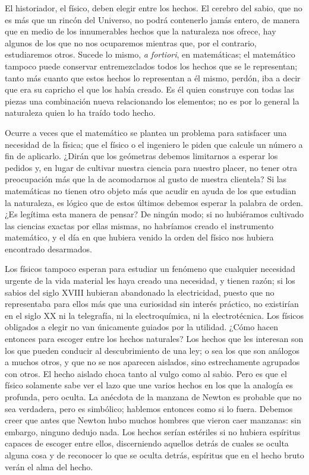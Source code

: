 \documentclass[a4paper, 12pt]{article}
\begin{document}
El historiador, el físico, deben elegir entre los hechos. El cerebro
del sabio, que no es más que un rincón del Universo, no podrá
contenerlo jamás entero, de manera que en medio de los innumerables
hechos que la naturaleza nos ofrece, hay algunos de los que no nos
ocuparemos mientras que, por el contrario, estudiaremos otros. Sucede lo
mismo, \textit{a fortiori}, en matemáticas; el matemático tampoco puede
conservar entremezclados todos los hechos que se le representan; tanto más cuanto que estos hechos lo representan a él mismo, perdón,
iba a decir que era su capricho el que los había creado. Es él
quien construye con todas las piezas una combinación nueva relacionando
los elementos; no es por lo general la naturaleza quien lo ha traído
todo hecho.

Ocurre a veces que el matemático se plantea un problema para satisfacer
una necesidad de la física; que el físico o el ingeniero le piden
que calcule un número a fin de aplicarlo. ¿Dirán que los geómetras debemos limitarnos a esperar los pedidos y, en lugar de cultivar
nuestra ciencia para nuestro placer, no tener otra preocupación más
que la de acomodarnos al gusto de nuestra clientela? Si las matemáticas
no tienen otro objeto más que acudir en ayuda de los que estudian la
naturaleza, es lógico que de estos últimos debemos esperar la
palabra de orden. ¿Es legítima esta manera de pensar? De ningún
modo; si no hubiéramos cultivado las ciencias exactas por ellas mismas,
no habríamos creado el instrumento matemático, y el día en que
hubiera venido la orden del físico nos hubiera encontrado desarmados.

Los físicos tampoco esperan para estudiar un fenómeno que cualquier
necesidad urgente de la vida material les haya creado una necesidad, y
tienen razón; si los sabios del siglo XVIII hubieran abandonado la
electricidad, puesto que no representaba para ellos más que una
curiosidad sin interés
práctico, no existirían en el siglo XX ni la telegrafía, ni la
electroquímica, ni la electrotécnica. Los físicos obligados a
elegir no van únicamente guiados por la utilidad. ¿Cómo hacen
entonces para escoger entre los hechos naturales? Los hechos que les interesan son los que pueden
conducir al descubrimiento de una ley; o sea los que son análogos a
muchos otros, y que no se nos aparecen aislados, sino estrechamente
agrupados con otros. El hecho aislado choca tanto al vulgo como al sabio.
Pero es que el físico solamente sabe ver el lazo que une varios hechos
en los que la analogía es profunda, pero oculta. La anécdota de la
manzana de Newton es probable que no sea verdadera, pero es simbólico;
hablemos entonces como si lo fuera. Debemos creer que antes que Newton hubo
muchos hombres que vieron caer manzanas: sin embargo, ninguno dedujo nada.
Los hechos serían estériles si no hubiera espíritus capaces de
escoger entre ellos, discerniendo aquellos detrás de cuales se oculta
alguna cosa y de reconocer lo que se oculta detrás, espíritus que
en el hecho bruto verán el alma del hecho.
\end{document}
